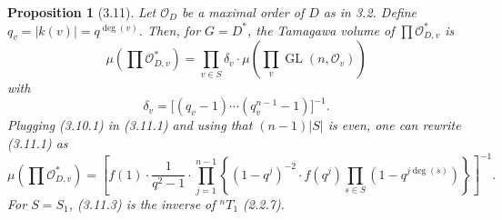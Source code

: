 \documentclass[10pt]{article}
\newcommand{\GL}{\operatorname{GL}}
\newcommand{\degm}{\operatorname{deg}}
\newcommand{\OD}{\mathcal O_D}
\newcommand{\OO}{\mathcal O}
\theoremstyle{deligne}
\newtheorem*{proposition*}{Proposition}
\begin{document}
\begin{proposition*}[3.11]
Let $\OD$ be a maximal order of $D$ as in 3.2. Define $q_v=|k(v)|=q^{\degm(v)}$. Then, for $G=D^*$, the Tamagawa volume of $\prod \mathcal O_{D,v}^*$ is
\begin{equation}\tag{3.11.1}
\mu\left(\prod \mathcal O_{D,v}^*\right)=\prod_{v\in S}\delta_v\cdot\mu\left(\prod_v\GL(n,\OO_v)\right)
\end{equation}
with
\begin{equation}\tag{3.11.2}
\delta_v=\bigl[(q_v-1)\cdots(q_v^{n-1}-1)\bigr]^{-1}.
\end{equation}
Plugging (3.10.1) in (3.11.1) and using that $(n-1)|S|$ is even, one can rewrite (3.11.1) as
\begin{equation}\tag{3.11.3}
\mu\left(\prod\mathcal O_{D,v}^*\right)=
\left[f(1)\cdot\frac{1}{q^2-1}\cdot\prod_{j=1}^{n-1}\left\{(1-q^j)^{-2}\cdot f(q^j)\prod_{s\in S}(1-q^{j\degm(s)})\right\}\right]^{-1}.
\end{equation}
For $S=S_1$, (3.11.3) is the inverse of ${}^nT_1$ (2.2.7).
\end{proposition*}
\end{document}
